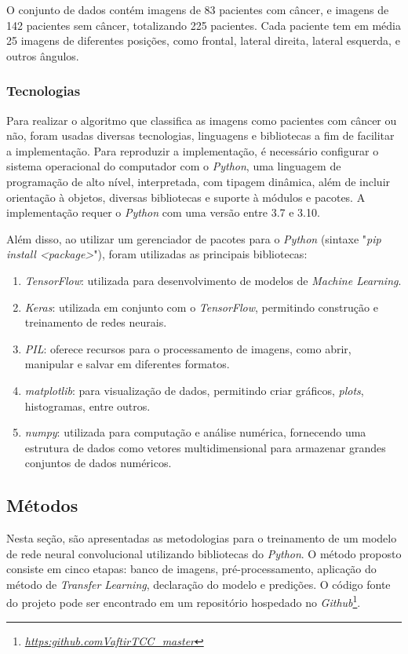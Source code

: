 O conjunto de dados contém imagens de 83 pacientes com câncer, e imagens de 142 pacientes sem câncer, totalizando 225 pacientes. Cada paciente tem em média 25 imagens de diferentes posições, como frontal, lateral direita, lateral esquerda, e outros ângulos.


\subsubsection{\esp Tecnologias} \label{techs}
Para realizar o algoritmo que classifica as imagens como pacientes com câncer ou não, foram usadas diversas tecnologias, linguagens e bibliotecas a fim de facilitar a implementação. Para reproduzir a implementação, é necessário configurar o sistema operacional do computador com o \textit{Python}, uma linguagem de programação de alto nível, interpretada, com tipagem dinâmica, além de incluir orientação à objetos, diversas bibliotecas e suporte à módulos e pacotes. A implementação requer o \textit{Python} com uma versão entre 3.7 e 3.10.


Além disso, ao utilizar um gerenciador de pacotes para o \textit{Python} (sintaxe "\textit{pip install <package>}"), foram utilizadas as principais bibliotecas:

\begin{enumerate}[label=\alph*)]
    \item \textit{TensorFlow}: utilizada para desenvolvimento de modelos de \textit{Machine Learning}.
    
    \item \textit{Keras}: utilizada em conjunto com o \textit{TensorFlow}, permitindo construção e treinamento de redes neurais.
    
    \item \textit{PIL}: oferece recursos para o processamento de imagens, como abrir, manipular e salvar em diferentes formatos.
        
    \item \textit{matplotlib}: para visualização de dados, permitindo criar gráficos, \textit{plots}, histogramas, entre outros.
    
    \item \textit{numpy}: utilizada para computação e análise numérica, fornecendo uma estrutura de dados como vetores multidimensional para armazenar grandes conjuntos de dados numéricos.
\end{enumerate}


\subsection{\esp Métodos} \label{metodos}
Nesta seção, são apresentadas as metodologias para o treinamento de um modelo de rede neural convolucional utilizando bibliotecas do \textit{Python}. O método proposto consiste em cinco etapas: banco de imagens, pré-processamento, aplicação do método de \textit{Transfer Learning}, declaração do modelo e predições. O código fonte do projeto pode ser encontrado em um repositório hospedado no \textit{Github}\footnote{\href{https://github.com/Vaftir/TCC_master/}{\textit{https:\/\/github.com\/Vaftir\/TCC\_master\/}}}.


